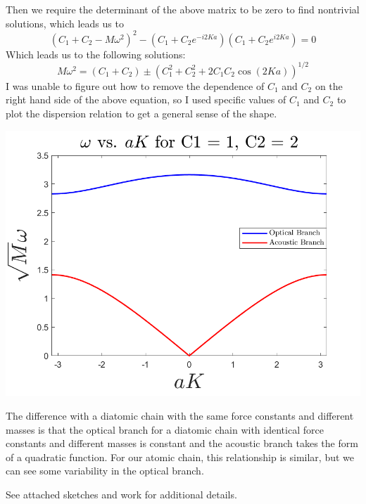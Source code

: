 \documentclass{article}
\begin{document}
Then we require the determinant of the above matrix to be zero to find nontrivial solutions, which leads us to
\[(C_1 + C_2 - M\omega^2)^2 - (C_1 + C_2e^{-i2Ka})(C_1 + C_2e^{i2Ka}) = 0\]
Which leads us to the following solutions:
\[M\omega^2 = (C_1 + C_2) \pm \left(C_1^2 + C_2^2 + 2C_1C_2\cos{(2Ka)}\right)^{1/2}\]
I was unable to figure out how to remove the dependence of $C_1$ and $C_2$ on the right hand side of the above equation, so I used specific values of $C_1$ and $C_2$ to plot the dispersion relation to get a general sense of the shape.
\begin{center}
    \includegraphics[scale = 0.6]{optical vs acoustic.png}
\end{center}
The difference with a diatomic chain with the same force constants and different masses is that the optical branch for a diatomic chain with identical force constants and different masses is constant and the acoustic branch takes the form of a quadratic function. For our atomic chain, this relationship is similar, but we can see some variability in the optical branch.

See attached sketches and work for additional details.
\end{document}
